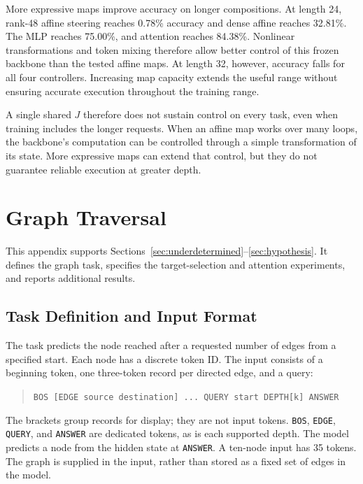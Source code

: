 \documentclass{article}
\begin{document}
More expressive maps improve accuracy on longer compositions. At length 24, rank-48 affine steering reaches 0.78\% accuracy and dense affine reaches 32.81\%. The MLP reaches 75.00\%, and attention reaches 84.38\%. Nonlinear transformations and token mixing therefore allow better control of this frozen backbone than the tested affine maps. At length 32, however, accuracy falls for all four controllers. Increasing map capacity extends the useful range without ensuring accurate execution throughout the training range.

A single shared $J$ therefore does not sustain control on every task, even when training includes the longer requests. When an affine map works over many loops, the backbone's computation can be controlled through a simple transformation of its state. More expressive maps can extend that control, but they do not guarantee reliable execution at greater depth.




\appendix

\section{Graph Traversal}
\label{app:main-config}
This appendix supports Sections~\ref{sec:underdetermined}--\ref{sec:hypothesis}. It defines the graph task, specifies the target-selection and attention experiments, and reports additional results.

\subsection{Task Definition and Input Format}
\label{app:graph-task}
The task predicts the node reached after a requested number of edges from a specified start. Each node has a discrete token ID. The input consists of a beginning token, one three-token record per directed edge, and a query:
\begin{quote}\small
\texttt{BOS [EDGE source destination] ... QUERY start DEPTH[k] ANSWER}
\end{quote}
The brackets group records for display; they are not input tokens. \texttt{BOS}, \texttt{EDGE}, \texttt{QUERY}, and \texttt{ANSWER} are dedicated tokens, as is each supported depth. The model predicts a node from the hidden state at \texttt{ANSWER}. A ten-node input has 35 tokens. The graph is supplied in the input, rather than stored as a fixed set of edges in the model.
\end{document}
